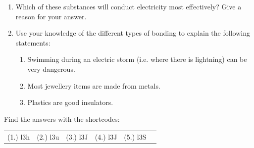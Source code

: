 \begin{enumerate}[noitemsep, label=\textbf{\arabic*}. ]
{\begin{center}
\begin{xtabular*}{\mytablewidth}[t]{|p{10\mystarwidth}|p{10\mystarwidth}|}
     \tabularnewline{}
    \end{xtabular*}
      \end{center}
    \begin{center}{\small\bfseries Table 5.3}\end{center}
    
    \addtocounter{footnote}{-0}
    
        }%
      
    \par
          \label{m38694*uid92}\item Which of these substances will conduct electricity most effectively? Give a reason for your answer.\newline
            
\label{m38694*uid93}\item Use your knowledge of the different types of bonding to explain the following statements:
\label{m38694*id143618}\begin{enumerate}[noitemsep, label=\textbf{\alph*}. ] 
            \label{m38694*uid94}\item Swimming during an electric storm (i.e. where there is lightning) can be very dangerous.
\label{m38694*uid95}\item Most jewellery items are made from metals.
\label{m38694*uid96}\item Plastics are good insulators.
\end{enumerate}
                \end{enumerate}
        
        


    
 
  \label{m38694**end}
          
\par {} Find the answers with the shortcodes:
 \par \begin{tabular}[h]{cccccc}
 (1.) l3h  &  (2.) l3u  &  (3.) l3J  &  (4.) l3J  &  (5.) l3S  & \end{tabular}




